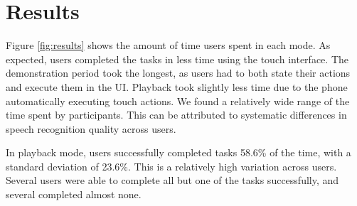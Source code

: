 \documentclass[letterpaper]{article}
\begin{document}



\section{Results}

Figure \ref{fig:results} shows the amount of time users spent in each mode. As expected, users completed the tasks in less time using the touch interface.
The demonstration period took the longest, as users had to both state their actions and execute them in the UI. Playback took slightly less time due to the
phone automatically executing touch actions. We found a relatively wide range of the time spent by participants. This can be attributed to systematic
differences in speech recognition quality across users.

In playback mode, users successfully completed tasks 58.6\% of the time, with a standard deviation of 23.6\%. This is a relatively high variation across
users. Several users were able to complete all but one of the tasks successfully, and several completed almost none. 
\end{document}
